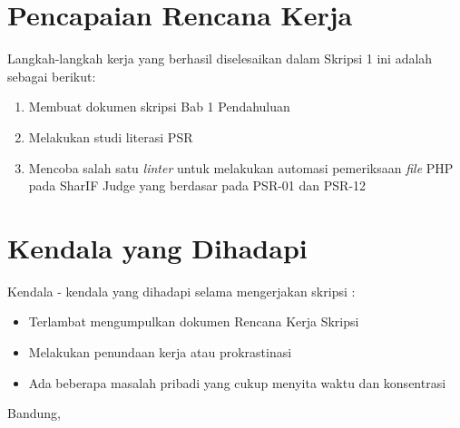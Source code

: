 \documentclass[a4paper,twoside]{article}
\begin{document}
\section{Pencapaian Rencana Kerja}
Langkah-langkah kerja yang berhasil diselesaikan dalam Skripsi 1 ini adalah sebagai berikut:
\begin{enumerate}
\item Membuat dokumen skripsi Bab 1 Pendahuluan 
\item Melakukan studi literasi PSR
\item Mencoba salah satu \textit{linter} untuk melakukan automasi pemeriksaan \textit{file} PHP pada SharIF Judge yang berdasar pada PSR-01 dan PSR-12
\end{enumerate}



\section{Kendala yang Dihadapi}
Kendala - kendala yang dihadapi selama mengerjakan skripsi :
\begin{itemize}
	\item Terlambat mengumpulkan dokumen Rencana Kerja Skripsi
	\item Melakukan penundaan kerja atau prokrastinasi
	\item Ada beberapa masalah pribadi yang cukup menyita waktu dan konsentrasi
	
\end{itemize}

\vspace{1cm}
\centering Bandung, \tanggal\\
\vspace{2cm} \nama \\ 
\vspace{1cm}
\end{document}
